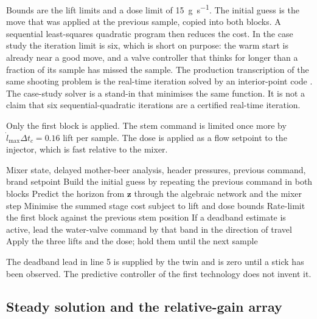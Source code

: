 Bounds are the lift limits and a dose limit of \SI{15}{\gram\per\second}. The initial guess is the move that was applied at the previous sample, copied into both blocks. A sequential least-squares quadratic program then reduces the cost. In the case study the iteration limit is six, which is short on purpose: the warm start is already near a good move, and a valve controller that thinks for longer than a fraction of its sample has missed the sample. The production transcription of the same shooting problem is the real-time iteration \citep{diehl2005,gros2020} solved by an interior-point code \citep{wachter2006,andersson2019}. The case-study solver is a stand-in that minimises the same function. It is not a claim that six sequential-quadratic iterations are a certified real-time iteration.

Only the first block is applied. The stem command is limited once more by $\dot l_{\max}\Delta t_c = 0.16$ lift per sample. The dose is applied as a flow setpoint to the injector, which is fast relative to the mixer.

\begin{algorithm}[htbp]
\caption{One sample of three-valve nonlinear model predictive control}
\label{alg:nmpc}
\begin{algorithmic}[1]
\Require Mixer state, delayed mother-beer analysis, header pressures, previous command, brand setpoint
\State Build the initial guess by repeating the previous command in both blocks
\State Predict the horizon from $\mathbf{z}$ through the algebraic network and the mixer step
\State Minimise the summed stage cost subject to lift and dose bounds
\State Rate-limit the first block against the previous stem position
\State If a deadband estimate is active, lead the water-valve command by that band in the direction of travel
\State Apply the three lifts and the dose; hold them until the next sample
\end{algorithmic}
\end{algorithm}

The deadband lead in line 5 is supplied by the twin and is zero until a stick has been observed. The predictive controller of the first technology does not invent it.

\subsection{Steady solution and the relative-gain array}

